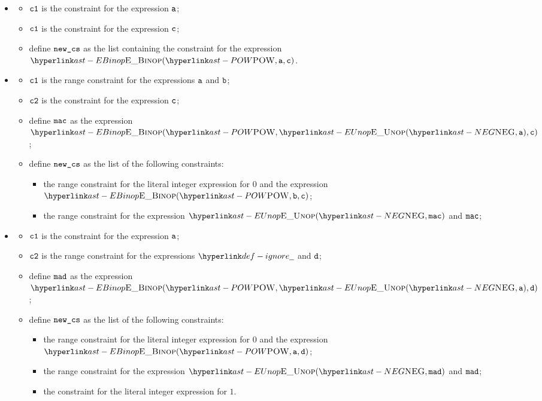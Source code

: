 \ProseParagraph
\OneApplies
\begin{itemize}
  \item {}
  \begin{itemize}
    \item $\texttt{c1}$ is the constraint for the expression $\texttt{a}$;
    \item $\texttt{c1}$ is the constraint for the expression $\texttt{c}$;
    \item define $\texttt{new\_cs}$ as the list containing the constraint
    for the expression \\ $\EBinop(\POW, \va, \vc)$.
  \end{itemize}

  \item {}
  \begin{itemize}
    \item $\texttt{c1}$ is the range constraint for the expressions $\texttt{a}$ and $\texttt{b}$;
    \item $\texttt{c2}$ is the constraint for the expression $\texttt{c}$;
    \item define $\texttt{mac}$ as the expression $\EBinop(\POW, \EUnop(\NEG, \va), \vc)$;
    \item define $\texttt{new\_cs}$ as the list of the following constraints:
    \begin{itemize}
      \item the range constraint for the literal integer expression for $0$ and the expression
            $\EBinop(\POW, \vb, \vc)$;
      \item the range constraint for the expression $\EUnop(\NEG, \vmac)$ and $\texttt{mac}$;
    \end{itemize}
  \end{itemize}

  \item {}
  \begin{itemize}
    \item $\texttt{c1}$ is the constraint for the expression $\texttt{a}$;
    \item $\texttt{c2}$ is the range constraint for the expressions $\Ignore$ and $\texttt{d}$;
    \item define $\texttt{mad}$ as the expression $\EBinop(\POW, \EUnop(\NEG, \va), \vd)$;
    \item define $\texttt{new\_cs}$ as the list of the following constraints:
    \begin{itemize}
      \item the range constraint for the literal integer expression for $0$ and the expression
            $\EBinop(\POW, \va, \vd)$;
      \item the range constraint for the expression $\EUnop(\NEG, \vmad)$ and $\texttt{mad}$;
      \item the constraint for the literal integer expression for $1$.
    \end{itemize}
  \end{itemize}


\end{itemize}

